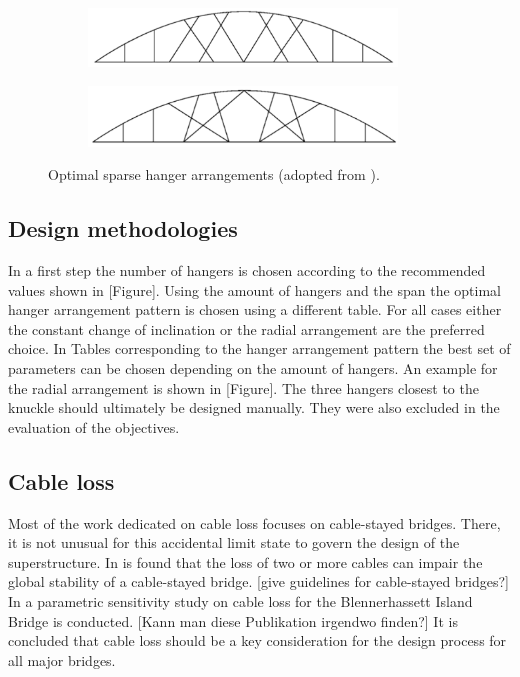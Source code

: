 \begin{figure}[H]
\centering
\begin{subfigure}{0.5\textwidth}
    \centering
    \includegraphics[width=0.9\textwidth]{Pictures/Tan 1.PNG}
\end{subfigure}%
\begin{subfigure}{.5\textwidth}
    \centering
    \includegraphics[width=0.9\textwidth]{Pictures/Tan 2.PNG}
\end{subfigure}
\caption{Optimal sparse hanger arrangements (adopted from \cite{Tan}).}
\label{fig:Tan}
\end{figure}



\subsection{Design methodologies} \label{sec:rev_meth}

In a first step the number of hangers is chosen according to the recommended values shown in [Figure]. Using the amount of hangers and the span the optimal hanger arrangement pattern is chosen using a different table. For all cases either the constant change of inclination or the radial arrangement are the preferred choice. In Tables corresponding to the hanger arrangement pattern the best set of parameters can be chosen depending on the amount of hangers. An example for the radial arrangement is shown in [Figure]. The three hangers closest to the knuckle should ultimately be designed manually. They were also excluded in the evaluation of the objectives.

\subsection{Cable loss} \label{sec:rev_cable}
Most of the work dedicated on cable loss focuses on cable-stayed bridges. There, it is not unusual for this accidental limit state to govern the design of the superstructure. In \citep{Wolff} is found that the loss of two or more cables can impair the global stability of a cable-stayed bridge.
[give guidelines for cable-stayed bridges?]
In \citep{Zoli} a parametric sensitivity study on cable loss for the Blennerhassett Island Bridge is conducted. [Kann man diese Publikation irgendwo finden?]
It is concluded that cable loss should be a key consideration for the design process for all major bridges.\bigskip

